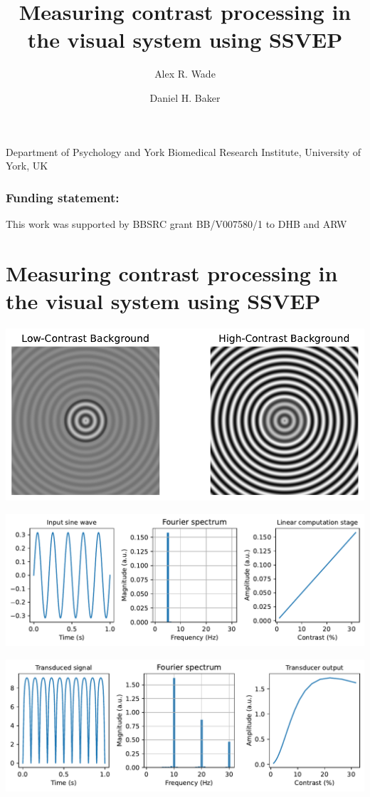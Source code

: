 \documentclass[
  letterpaper,
  DIV=11,
  numbers=noendperiod]{scrartcl}
\title{Measuring contrast processing in the visual system using SSVEP}
\author{Alex R. Wade \and Daniel H. Baker}
\date{}
\begin{document}
\maketitle

Department of Psychology and York Biomedical Research Institute,
University of York, UK

\subsubsection{Funding statement:}\label{funding-statement}

This work was supported by BBSRC grant BB/V007580/1 to DHB and ARW

\newpage{}

\section{Measuring contrast processing in the visual system using
SSVEP}\label{measuring-contrast-processing-in-the-visual-system-using-ssvep}

\includegraphics{review_files/figure-pdf/cell-3-output-1.pdf}

\includegraphics{review_files/figure-pdf/cell-4-output-1.pdf}

\includegraphics{review_files/figure-pdf/cell-5-output-1.pdf}
\end{document}
